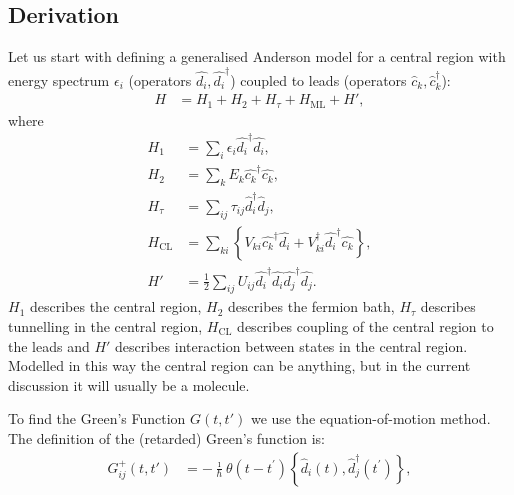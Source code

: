 \documentclass{article}
\begin{document}
\begin{multicols}{2}
    \section{Derivation}\label{sec:derivation}
        Let us start with defining a generalised Anderson model for a central region with energy spectrum $\epsilon_i$ (operators $\hat{d_i}, \hat{d_i}^\dagger$) coupled to leads (operators $\hat{c}_k, \hat{c}_k^\dagger$):
        \begin{align}
            H &= H_1 + H_2 + H_\tau + H_\text{ML} + H', \label{eq:hamiltonian}
        \end{align}
        where
        \begin{align*}
        H_1 &= \sum_i \epsilon_i \hat{d_i}^\dagger \hat{d_i}, \\
        H_2 &= \sum_k E_k \hat{c_k}^\dagger \hat{c_k}, \\
        H_\tau &= \sum_{ij} \tau_{ij} \hat{d}_i^\dagger \hat{d}_j, \\
        H_\text{CL} &= \sum_{ki}\left\{ V_{ki} \hat{c_k}^\dagger \hat{d_i} +  V_{ki}^\dagger \hat{d_i}^\dagger \hat{c_k} \right\},\\
        H' &= \frac{1}{2} \sum_{ij} U_{ij} \hat{d_i}^\dagger \hat{d_i}\hat{d_j}^\dagger \hat{d_j}.
        \end{align*}
        $H_1$ describes the central region, $H_2$ describes the fermion bath, $H_\tau$ describes tunnelling in the central region, $H_\text{CL}$ describes coupling of the central region to the leads and $H'$ describes interaction between states in the central region. Modelled in this way the central region can be anything, but in the current discussion it will usually be a molecule.
    
        To find the Green's Function $G(t,t')$ we use the equation-of-motion method. The definition of the (retarded) Green's function is:
       \begin{align*}
        G_{ij}^+(t,t') &= - \frac{\imath}{\hbar} \theta(t-t^\prime) \left\{ \hat{d}_i(t), \hat{d}_j^\dagger(t^\prime) \right\},
        \end{align*} 
        

\end{multicols}
\end{document}
